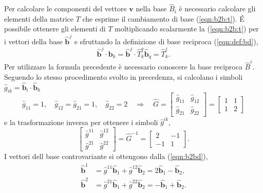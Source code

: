 %
Per calcolare le componenti del vettore $\bm{v}$ nella base $\hat{B}_i$ è necessario calcolare gli elementi della matrice $T$ che esprime il cambiamento di base (\ref{eqn:b2b:t}). \'E possibile ottenere gli elementi di $T$ moltiplicando scalarmente la (\ref{eqn:b2b:t}) per i vettori della base $\bm{\hat{b}}^j$ e sfruttando la definizione di base reciproca (\ref{eqn:def:bd}),
\begin{equation}\label{eqn:eseTrasf}
 \bm{\hat{b}}^j \cdot \bm{b}_k = \bm{\hat{b}}^j \cdot \hat{T}^{q}_{k} \bm{\hat{b}}_{q} = \hat{T}^{j}_{k} .
\end{equation}
%
Per utilizzare la formula precedente è necessario conoscere la base reciproca $\hat{B}^i$. Seguendo lo stesso procedimento svolto in precedenza, si calcolano i simboli $\hat{g}_{ik} = \bm{\hat{b}}_i \cdot \bm{\hat{b}}_k$
\begin{equation}
 \hat{g}_{11} = 1 , \quad \hat{g}_{12} = \hat{g}_{21} = 1 , \quad \hat{g}_{22} = 2
\quad \Rightarrow \quad
 \hat{G} = \begin{bmatrix} \hat{g}_{11} & \hat{g}_{12} \\
                           \hat{g}_{21} & \hat{g}_{22} \end{bmatrix}
         = \begin{bmatrix} 1 & 1 \\ 1 & 2 \end{bmatrix}
\end{equation}
 e la trasformazione inversa per ottenere i simboli $\hat{g}^{ik}$,
\begin{equation}
 \begin{bmatrix} \hat{g}^{11} & \hat{g}^{12} \\
                 \hat{g}^{21} & \hat{g}^{22} \end{bmatrix} = \hat{G}^{-1} =
 \begin{bmatrix} 2 & -1 \\ -1 & 1 \end{bmatrix} .
\end{equation}
I vettori dell base controvariante si ottengono dalla (\ref{eqn:b2bd}),
\begin{equation}
\begin{aligned}
 \bm{\hat{b}}^1 & = \hat{g}^{11} \bm{\hat{b}}_1 + \hat{g}^{12} \bm{\hat{b}}_2 = 
      2 \bm{\hat{b}}_1 - \bm{\hat{b}}_2  , \\
 \bm{\hat{b}}^2 & = \hat{g}^{21} \bm{\hat{b}}_1 + \hat{g}^{22} \bm{\hat{b}}_2 =
     - \bm{\hat{b}}_1 + \bm{\hat{b}}_2 .
\end{aligned}
\end{equation}
